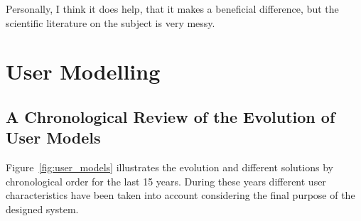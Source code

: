 

\begin{savequote}[50mm]
Personally, I think it does help, that it makes a beneficial difference, but the scientific literature on the subject is very messy.
%
\end{savequote}


\section{User Modelling}
\label{sec:user}

\ifpdf
    \graphicspath{{2_state_of_the_art/figures/PNG/}{2_state_of_the_art/figures/PDF/}{2_state_of_the_art/figures/}}
\else
    \graphicspath{{2_state_of_the_art/figures/EPS/}{2_state_of_the_art/figures/}}
\fi



\subsection{A Chronological Review of the Evolution of User Models}
\label{sec:chronological_review}

Figure~\ref{fig:user_models} illustrates the evolution and different solutions by 
chronological order for the last 15 years. During these years different user
characteristics have been taken into account considering the final purpose of
the designed system. 

\vspace{1cm}
\setlength\taskwidth{1.7cm}

\begin{timeline}
  \label{chr:users}
\end{timeline}


